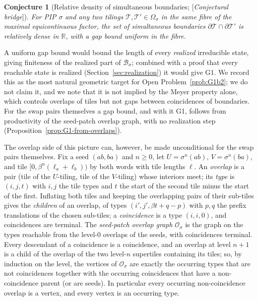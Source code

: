 \documentclass[11pt]{amsart}
\theoremstyle{plain}
\newtheorem{conjecture}[theorem]{Conjecture}
\theoremstyle{definition}
\theoremstyle{remark}
\newcommand{\R}{\mathbb{R}}
\newcommand{\B}{\mathcal{B}}
\newcommand{\Status}[1]{\textup{[\textit{#1}]}}
\begin{document}
\begin{conjecture}[Relative density of simultaneous boundaries; \Status{Conjectural bridge}]\label{conj:density}
For PIP $\sigma$ and any two tilings $\mathcal T,\mathcal T'\in\Omega_\sigma$ in the same fibre of the maximal equicontinuous factor, the set of simultaneous boundaries $\partial\mathcal T\cap\partial\mathcal T'$ is relatively dense in $\R$, with a gap bound uniform in the fibre.
\end{conjecture}

A uniform gap bound would bound the length of every \emph{realized} irreducible state, giving finiteness of the realized part of $\B_\sigma$; combined with a proof that every reachable state is realized (Section~\ref{sec:realization}) it would give G1. We record this as the most natural geometric target for Open Problem~\ref{prob:G1b2}; we do not claim it, and we note that it is not implied by the Meyer property alone, which controls overlaps of tiles but not gaps between coincidences of boundaries. For the swap pairs themselves a gap bound, and with it G1, follows from productivity of the seed-patch overlap graph, with no realization step (Proposition~\ref{prop:G1-from-overlaps}).

The overlap side of this picture can, however, be made unconditional for the swap pairs themselves. Fix a seed $(ab,ba)$ and $n\ge0$, let $U=\sigma^n(ab)$, $V=\sigma^n(ba)$, and tile $[0,\beta^n(\ell_a+\ell_b))$ by both words with tile lengths $\ell$. An \emph{overlap} is a pair (tile of the $U$-tiling, tile of the $V$-tiling) whose interiors meet; its \emph{type} is $(i,j,t)$ with $i,j$ the tile types and $t$ the start of the second tile minus the start of the first. Inflating both tiles and keeping the overlapping pairs of their sub-tiles gives the \emph{children} of an overlap, of types $(i',j',\beta t+q-p)$ with $p,q$ the prefix translations of the chosen sub-tiles; a \emph{coincidence} is a type $(i,i,0)$, and coincidences are terminal. The \emph{seed-patch overlap graph} $\mathcal O_\sigma$ is the graph on the types reachable from the level-$0$ overlaps of the seeds, with coincidences terminal. Every descendant of a coincidence is a coincidence, and an overlap at level $n+1$ is a child of the overlap of the two level-$n$ supertiles containing its tiles; so, by induction on the level, the vertices of $\mathcal O_\sigma$ are exactly the occurring types that are not coincidences together with the occurring coincidences that have a non-coincidence parent (or are seeds). In particular every occurring non-coincidence overlap is a vertex, and every vertex is an occurring type.
\end{document}
